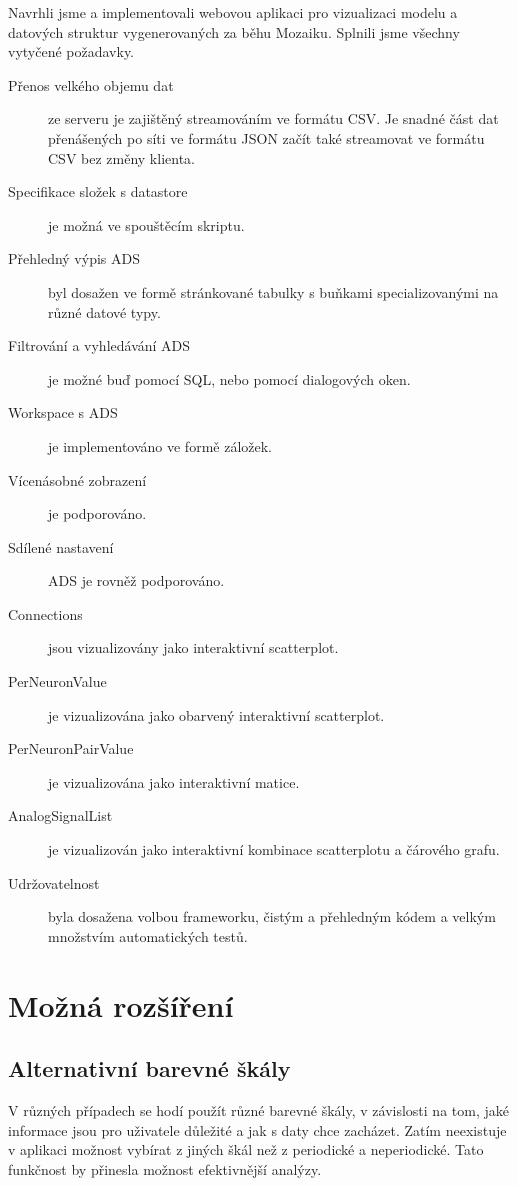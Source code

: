 

Navrhli jsme a implementovali webovou aplikaci pro vizualizaci modelu a datových struktur vygenerovaných za běhu Mozaiku. Splnili jsme všechny vytyčené požadavky.

\begin{description}
  \item[Přenos velkého objemu dat] ze serveru je zajištěný streamováním ve formátu CSV. Je snadné část dat přenášených po síti ve formátu JSON začít také streamovat ve formátu CSV bez změny klienta.
  \item[Specifikace složek s datastore] je možná ve spouštěcím skriptu.
  \item[Přehledný výpis ADS] byl dosažen ve formě stránkované tabulky s buňkami specializovanými na různé datové typy.
  \item[Filtrování a vyhledávání ADS] je možné buď pomocí SQL, nebo pomocí dialogových oken.
  \item[Workspace s ADS] je implementováno ve formě záložek.
  \item[Vícenásobné zobrazení] je podporováno.
  \item[Sdílené nastavení] ADS je rovněž podporováno.
  \item[Connections] jsou vizualizovány jako interaktivní scatterplot.
  \item[PerNeuronValue] je vizualizována jako obarvený interaktivní scatterplot.
  \item[PerNeuronPairValue] je vizualizována jako interaktivní matice.
  \item[AnalogSignalList] je vizualizován jako interaktivní kombinace scatterplotu a čárového grafu.
  \item[Udržovatelnost] byla dosažena volbou frameworku, čistým a přehledným kódem a velkým množstvím automatických testů.
\end{description}

\section*{Možná rozšíření}

\subsection*{Alternativní barevné škály}

V různých případech se hodí použít různé barevné škály, v závislosti na tom, jaké informace jsou pro uživatele důležité a jak s daty chce zacházet\cite{silva2007there}. Zatím neexistuje v aplikaci možnost vybírat z jiných škál než z periodické a neperiodické. Tato funkčnost by přinesla možnost efektivnější analýzy.

